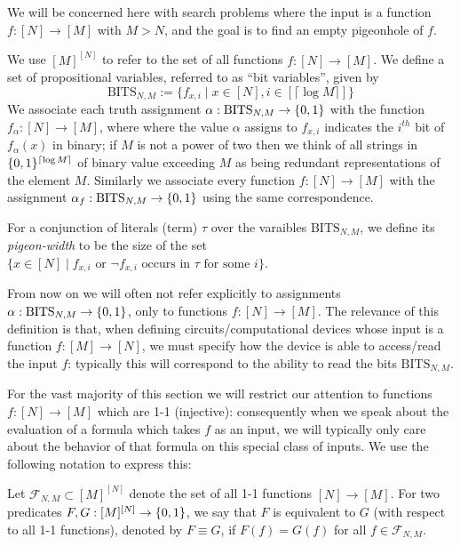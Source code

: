 We will be concerned here with search problems where the input is a function $f: [N] \to [M]$ with $M > N$, and the goal is to find an empty pigeonhole of $f$. 
\begin{definition}
We use $[M]^{[N]}$ to refer to the set of all functions $f: [N] \to [M]$.
We define a set of propositional variables, referred to as ``bit variables'', given by 
\[
\mathrm{BITS}_{N,M}:=\{f_{x,i} \mid x \in [N], i \in [\lceil \log M \rceil]\}
\] We associate each truth assignment $\alpha: \mathrm{BITS}_{N,M} \to \{0,1\}$ with the function $f_{\alpha}: [N] \to [M]$, where where the value $\alpha$ assigns to $f_{x,i}$ indicates the $i^{th}$ bit of $f_{\alpha}(x)$ in binary; if $M$ is not a power of two then we think of all strings in $\{0,1\}^{\lceil \log M \rceil}$ of binary value exceeding $M$ as being redundant representations of the element $M$. Similarly we associate every function $f: [N] \to [M]$ with the assignment $\alpha_f: \mathrm{BITS}_{N,M} \to \{0,1\}$ using the same correspondence. 

For a conjunction of literals (term) $\tau$ over the varaibles $\mathrm{BITS}_{N,M}$, we define its \emph{pigeon-width} to be the size of the set $\{x \in [N]\mid  f_{x,i} \text{ or } \lnot f_{x,i} \text{ occurs in } \tau \text{ for some } i \}$.
\end{definition}
From now on we will often not refer explicitly to assignments $\alpha: \mathrm{BITS}_{N,M} \to \{0,1\}$, only to functions $f: [N] \to [M]$. 
The relevance of this definition is that, when defining circuits/computational devices whose input is a function $f: [M] \to [N]$, we must specify how the device is able to access/read the input $f$: typically this will correspond to the ability to read the bits $\mathrm{BITS}_{N,M}$.

For the vast majority of this section we will restrict our attention to functions $f: [N] \to [M]$ which are 1-1 (injective): consequently when we speak about the evaluation of a formula which takes $f$ as an input, we will typically only care about the behavior of that formula on this special class of inputs. We use the following notation to express this:
\begin{definition}
Let $\mathcal{F}_{N,M} \subset [M]^{[N]}$ denote the set of all 1-1 functions $[N] \to [M]$. For two predicates $F,G:[M]^{[N]}\to \{0,1\}$, we say that $F$ is equivalent to $G$ (with respect to all 1-1 functions), denoted by  $F \equiv G$, if $F(f)=G(f)$ for all $f \in \mathcal{F}_{N,M}$.
\end{definition}

